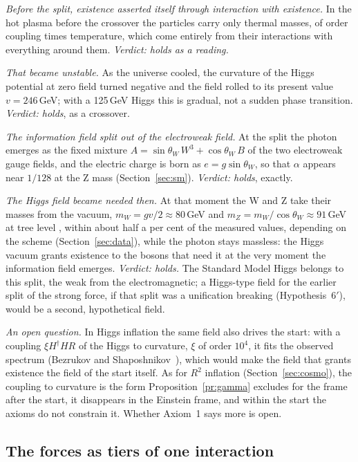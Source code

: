 \emph{Before the split, existence asserted itself through interaction with existence.} In the hot plasma before the crossover the particles
carry only thermal masses, of order coupling times temperature, which come entirely from their interactions with everything around them.
\emph{Verdict: holds as a reading.}

\emph{That became unstable.} As the universe cooled, the curvature of the Higgs potential at zero field turned negative and the field
rolled to its present value $v=246$\,GeV; with a 125\,GeV Higgs this is gradual, not a sudden phase transition. \emph{Verdict: holds}, as a
crossover.

\emph{The information field split out of the electroweak field.} At the split the photon emerges as the fixed mixture
$A=\sin\theta_W\,W^3+\cos\theta_W\,B$ of the two electroweak gauge fields, and the electric charge is born as $e=g\sin\theta_W$, so that $\alpha$
appears near $1/128$ at the Z mass  (Section~\ref{sec:sm}). \emph{Verdict: holds}, exactly.

\emph{The Higgs field became needed then.} At that moment the W and Z take their masses from the vacuum, $m_W=gv/2\approx80$\,GeV and
$m_Z=m_W/\cos\theta_W\approx91$\,GeV at tree level , within about half a per cent of the measured values, depending on the
scheme (Section~\ref{sec:data}), while the photon stays massless:
the Higgs vacuum grants existence to the bosons that need it at the very moment the information field emerges. \emph{Verdict: holds.} The
Standard Model Higgs belongs to this split, the weak from the electromagnetic; a Higgs-type field for the earlier split of the strong force,
if that split was a unification breaking (Hypothesis~6$'$), would be a second, hypothetical field.

\emph{An open question.} In Higgs inflation the same field also drives the start: with a coupling $\xi H^\dagger HR$ of the Higgs to
curvature, $\xi$ of order $10^4$, it fits the observed spectrum (Bezrukov and Shaposhnikov~\cite{bezrukov}), which would make the field
that grants existence the field of the start itself. As for $R^2$ inflation (Section~\ref{sec:cosmo}), the coupling to curvature is the
form Proposition~\ref{pr:gamma} excludes for the frame after the start, it disappears in the Einstein frame, and within the start the
axioms do not constrain it. Whether Axiom~1 says more is open.

\subsection{The forces as tiers of one interaction}

